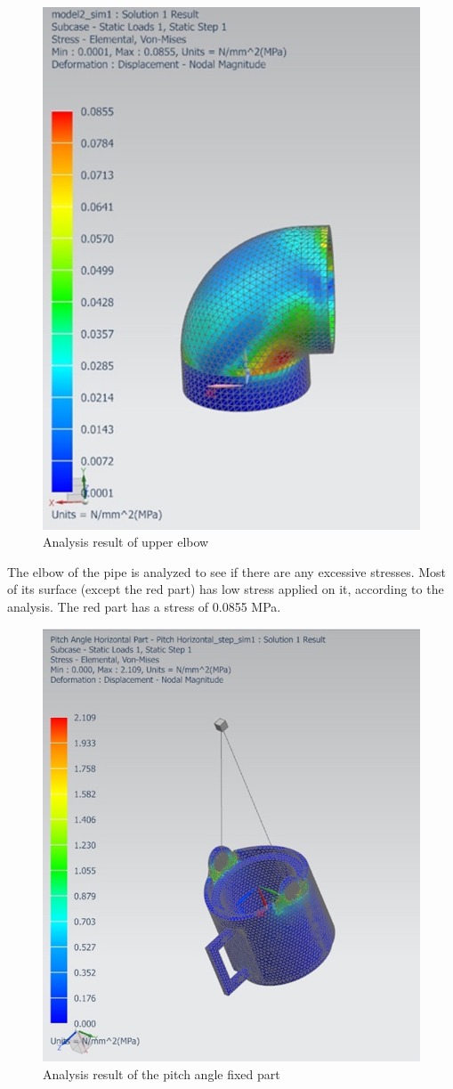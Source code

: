 \documentclass[12pt]{report}
\begin{document}
\begin{figure}[h!]
    \centering
    \includegraphics[width=0.5\linewidth]{elbowfinal.png}
    \caption{Analysis result of upper elbow}
    \label{fig:upperelbowfinal}
\end{figure}


The elbow of the pipe is analyzed to see if there are any excessive stresses. Most of its surface (except the red part) has low stress applied on it, according to the analysis. The red part has a stress of 0.0855 MPa.
\newpage

\begin{figure}[H]
    \centering
    \includegraphics[width=0.6\linewidth]{pitchanglefixedfinal.png}
    \caption{Analysis result of the pitch angle fixed part}
    \label{fig:pitchanglefixedfinal}
\end{figure}
\end{document}
